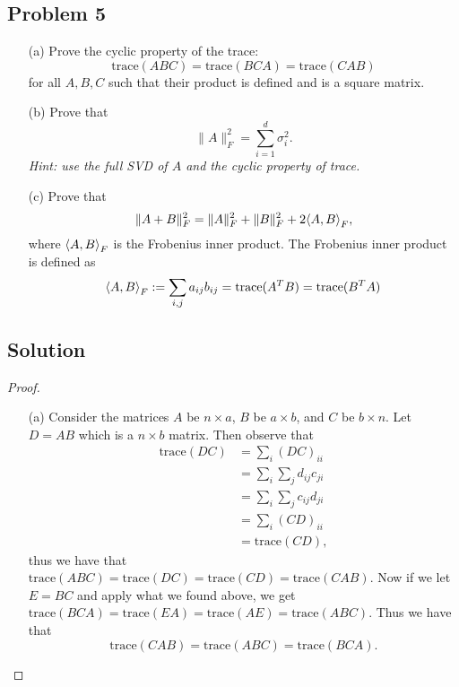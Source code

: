 \documentclass[12pt]{report}
\begin{document}

\def\trace{{\text{trace}}}

\begin{problem}%
\subsection*{Problem 5}

\begin{enumerate}
    \item [(a)] Prove the cyclic property of the trace:
    \[
         \trace(ABC) = \trace(BCA) = \trace(CAB)
    \]
    for all $A,B,C$ such that their product is defined and is a square matrix.
    \item [(b)] Prove that
    \[
        \|A\|_F^2 = \sum_{i=1}^d \sigma_i^2.
    \]
    \textit{Hint: use the full SVD of $A$ and the cyclic property of trace.}
    \item [(c)] Prove that
    \[
         \|A + B \|_F^2 = \|A\|_F^2 + \|B\|_F^2 + 2 {\left\langle A,B\right\rangle}_F,
    \]
    where ${\left\langle A,B\right\rangle}_F$ is the Frobenius inner product. The Frobenius inner product is defined as
    \[
         \abrac{A,B}_F := \sum_{i,j}a_{ij}b_{ij} = \trace(A^TB) = \trace(B^TA)
    \]
    


\end{enumerate}

\subsection*{Solution}
\begin{proof}

\begin{enumerate}
    \item [(a)]
    Consider the matrices $A$ be $n \times a$, $B$ be $a \times b$, and $C$ be $b \times n$. Let $D = AB$ which is a $n \times b$ matrix. Then observe that 
    \begin{align*}
        \trace(DC) &= \sum_{i} (DC)_{ii}\\
                &= \sum_{i}\sum_{j} d_{ij}c_{ji}\\    
                &= \sum_{i}\sum_{j} c_{ij}d_{ji}\\    
                &= \sum_{i} (CD)_{ii}\\
                &= \trace(CD),    
    \end{align*}
    thus we have that $\trace(ABC) = \trace(DC) = \trace(CD) = \trace(CAB)$. Now if we let $E = BC$ and apply what we found above, we get $\trace(BCA) = \trace(EA) = \trace(AE) = \trace(ABC)$. Thus we have that
    \[
        \trace(CAB) = \trace(ABC) = \trace(BCA).
    \]
    

\end{enumerate}
\end{proof}
\end{problem}
\end{document}
